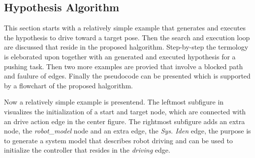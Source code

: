 \subsection{Hypothesis Algorithm}%
\label{subsec:halgorithm}
This section starts with a relatively simple example that generates and executes the hypothesis to drive toward a target pose. Then the search and execution loop are discussed that reside in the proposed \ac{halgorithm}. Step-by-step the termology is eleborated upon together with an generated and executed hypothesis for a pushing task. Then two more examples are provied that involve a blocked path and faulure of edges. Finally the pseudocode can be presented which is supported by a flowchart of the proposed \ac{halgorithm}.\bs

Now a relatively simple example is presentend. The leftmost subfigure in  visualizes the initialization of a start and target node, which are connected with an drive action edge in the center figure. The rightmost subfigure adds an extra node, the \textit{robot\_model} node and an extra edge, the \textit{Sys. Iden} edge, the purpose is to generate a system model that describes robot driving and can be used to initialize the controller that resides in the \textit{driving} edge.\bs

